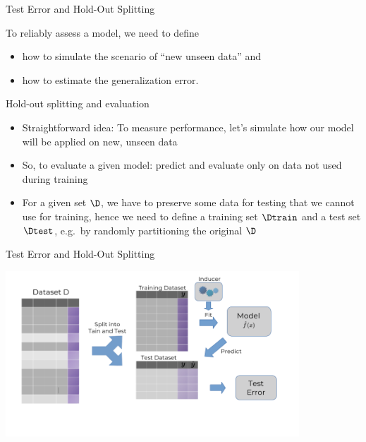 \begin{frame}{Test Error and Hold-Out Splitting}

To reliably assess a model, we need to define

\begin{itemize}
\item
  how to simulate the scenario of \enquote{new unseen data} and
\item
  how to estimate the generalization error.
\end{itemize}

Hold-out splitting and evaluation

\begin{itemize}
\item
  Straightforward idea: To measure performance, let's simulate how our
  model will be applied on new, unseen data
\item
  So, to evaluate a given model: predict and evaluate only on data not
  used during training
\item
  For a given set \(\D\), we have to preserve some data for testing that
  we cannot use for training, hence we need to define a training set
  \(\Dtrain\) and a test set \(\Dtest\), e.g.~by randomly partitioning
  the original \(\D\)
\end{itemize}

\end{frame}

\begin{frame}{Test Error and Hold-Out Splitting}

\includegraphics[width=11cm]{plots/test_error.png}

\end{frame}

